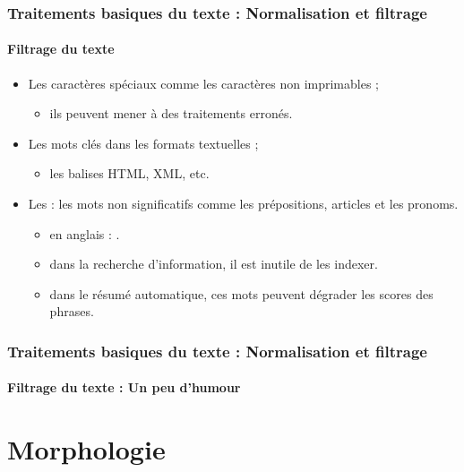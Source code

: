 \documentclass[xcolor=table]{beamer}
\begin{document}
\begin{frame}
\frametitle{Traitements basiques du texte : Normalisation et filtrage}
\framesubtitle{Filtrage du texte}

\begin{itemize}
	\item Les caractères spéciaux comme les caractères non imprimables ;
	\begin{itemize}
		\item ils peuvent mener à des traitements erronés. 
	\end{itemize}
	\item Les mots clés dans les formats textuelles ;
	\begin{itemize}
		\item les balises HTML, XML, etc. 
	\end{itemize}
	\item Les  : les mots non significatifs comme les prépositions, articles et les pronoms.
	\begin{itemize}
		\item en anglais : .
		\item dans la recherche d'information, il est inutile de les indexer.
		\item dans le résumé automatique, ces mots peuvent dégrader les scores des phrases.
	\end{itemize}
\end{itemize}

\end{frame}

\begin{frame}
\frametitle{Traitements basiques du texte : Normalisation et filtrage}
\framesubtitle{Filtrage du texte : Un peu d'humour}

\begin{center}
\end{center}

\end{frame}

\section{Morphologie}
\end{document}
